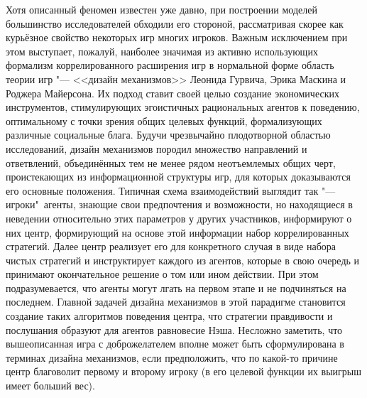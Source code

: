 Хотя описанный феномен известен уже давно, при построении моделей большинство исследователей обходили его стороной, рассматривая скорее как курьёзное свойство некоторых игр многих игроков. Важным исключением при этом выступает, пожалуй, наиболее значимая из активно использующих формализм коррелированного расширения игр в нормальной форме область теории игр "--- <<дизайн механизмов>> \fixme{[2]} Леонида Гурвича, Эрика Маскина и Роджера Майерсона. Их подход ставит своей целью создание экономических инструментов, стимулирующих эгоистичных рациональных агентов к поведению, оптимальному с точки зрения общих целевых функций, формализующих различные социальные блага. Будучи чрезвычайно плодотворной областью исследований, дизайн механизмов породил множество направлений и ответвлений, объединённых тем не менее рядом неотъемлемых общих черт, проистекающих из информационной структуры игр, для которых доказываются его основные положения. Типичная схема взаимодействий выглядит так "--- игроки"~агенты, знающие свои предпочтения и возможности, но находящиеся в неведении относительно этих параметров у других участников, информируют о них центр, формирующий на основе этой информации набор коррелированных стратегий. Далее центр реализует его для конкретного случая в виде набора чистых стратегий и инструктирует каждого из агентов, которые в свою очередь и принимают окончательное решение о том или ином действии. При этом подразумевается, что агенты могут лгать на первом этапе и не подчиняться на последнем. Главной задачей дизайна механизмов в этой парадигме становится создание таких алгоритмов поведения центра, что стратегии правдивости и послушания образуют для агентов равновесие Нэша. Несложно заметить, что вышеописанная игра с доброжелателем вполне может быть сформулирована в терминах дизайна механизмов, если предположить, что по какой-то причине центр благоволит первому и второму игроку (в его целевой функции их выигрыш имеет больший вес).


